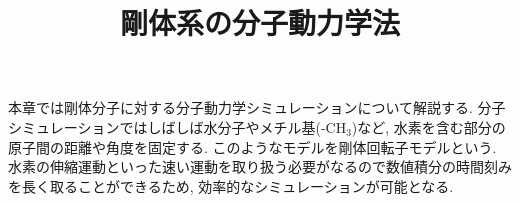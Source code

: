 





\title{剛体系の分子動力学法}
\maketitle

本章では剛体分子に対する分子動力学シミュレーションについて解説する\cite{Miller2002}.
分子シミュレーションではしばしば水分子やメチル基(-CH$_{3}$)など, 水素を含む部分の原子間の距離や角度を固定する.
このようなモデルを剛体回転子モデルという.
水素の伸縮運動といった速い運動を取り扱う必要がなるので数値積分の時間刻みを長く取ることができるため,
効率的なシミュレーションが可能となる.

